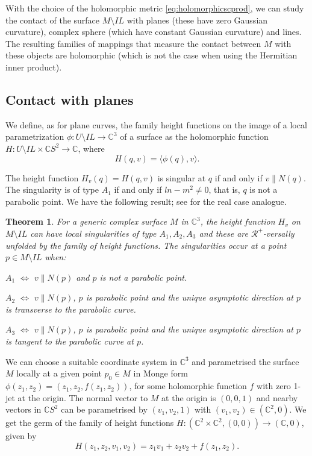 \documentclass[12pt,a4paper]{article}
\newtheorem{theo}[prop]{Theorem}
\begin{document}
With the choice of the holomorphic metric \eqref{eq:holomorphicscprod}, we can study the contact of the surface $M\setminus IL$ 
with planes (these have zero Gaussian curvature), complex sphere (which have constant Gaussian curvature) and lines. The resulting families of mappings that measure the contact between $M$ with these objects are holomorphic (which is not the case when using the Hermitian inner product). 


\subsection{Contact with planes}\label{ss:contactPlanesSurf}
We define, as for plane curves, the family height functions on the image of a local parametrization  $\phi:U\setminus IL\to \mathbb C^3$ of a surface as the holomorphic function
$H:U\setminus IL\times \mathbb CS^2\to \mathbb C$, where
$$
H(q,v)=\langle \phi(q),{v}\rangle.
$$

The height function $H_v(q)=H(q,v)$ is singular at $q$ if and only if $v\parallel N(q)$. 
The singularity is of type $A_1$ if and only if $ln-m^2\ne 0$, that is, $q$ is not a parabolic point. 
We have the following result; see \cite[Chapter 6]{IRRT} for the real case analogue.

\begin{theo}\label{theo:CHeightfctSurf} 
For a generic complex surface  $M$ in $\mathbb C^3$, the height function $H_v$ on $M\setminus IL$ can have local singularities of type $A_1,A_2,A_3$ and these are $\mathcal R^+$-versally unfolded by the family of height functions. 
The singularities occur at a point $p\in M\setminus IL$ when:

$A_1$ $\iff$ $v\parallel N(p) $ and $p$ is not a parabolic point.

$A_2$ $\iff$ $v\parallel  N(p)$, $p$ is parabolic point and the unique  asymptotic direction at $p$ is transverse to the parabolic curve.

$A_3$ $\iff$ $v\parallel  N(p)$, $p$ is parabolic point and the unique  asymptotic direction at $p$ is tangent to the parabolic curve at $p$. 
\end{theo} 

We can choose a suitable coordinate system in $\mathbb C^3$ and parametrised the surface $M$ locally at a given point $p_0\in M$ in Monge form $\phi(z_1,z_2)=(z_1,z_2,f(z_1,z_2))$, for some holomorphic function $f$ with zero 1-jet at the origin. The normal vector to $M$ at the origin is $(0,0,1)$ and nearby vectors in $\mathbb C S^2$ can be parametrised by $(v_1,v_2,1)$ with $(v_1,v_2)\in (\mathbb C^2,0)$. We get the germ of the family of height functions $H:(\mathbb C^2\times   \mathbb C^2,(0,0))\to (\mathbb C,0)$, given by
\begin{equation}\label{eq:CheightSurfMonge}
H(z_1,z_2,v_1,v_2)=z_1v_1+z_2v_2+f(z_1,z_2).
\end{equation}
\end{document}
